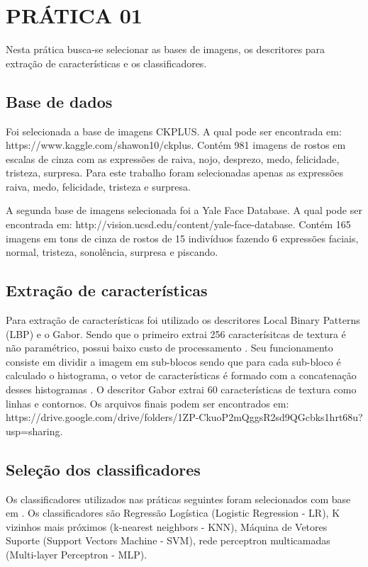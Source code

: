 \documentclass[a4paper, 12 pt, conference]{ieeeconf}  %
\begin{document}
\section{PRÁTICA 01}
\label{pratica01}
Nesta prática busca-se selecionar as bases de imagens, os descritores para extração de características e os classificadores.

\subsection{Base de dados}
Foi selecionada a base de imagens CKPLUS. A qual pode ser encontrada em: https://www.kaggle.com/shawon10/ckplus. Contém 981 imagens de rostos em escalas de cinza com as expressões de raiva, nojo, desprezo, medo, felicidade, tristeza, surpresa. Para este trabalho foram selecionadas apenas as expressões raiva, medo, felicidade, tristeza e surpresa.

A segunda base de imagens selecionada foi a Yale Face Database. A qual pode ser encontrada em: http://vision.ucsd.edu/content/yale-face-database. Contém 165 imagens em tons de cinza de rostos de 15 indivíduos fazendo 6 expressões faciais, normal, tristeza, sonolência, surpresa e piscando.

\subsection{Extração de características}
Para extração de características foi utilizado os descritores Local Binary Patterns (LBP) e o Gabor. Sendo que o primeiro extrai 256 caracterísitcas de textura é não paramétrico, possui baixo custo de processamento \cite{rajan:19}. Seu funcionamento consiste em dividir a imagem em sub-blocos sendo que para cada sub-bloco é calculado o histograma, o vetor de características é formado com a concatenação desses histogramas \cite{rajan:19}. O descritor Gabor extrai 60 características de textura como linhas e contornos. Os arquivos finais podem ser encontrados em: https://drive.google.com/drive/folders/1ZP-CkuoP2mQggsR2sd9QGcbks1hrt68u?usp=sharing.

\subsection{Seleção dos classificadores}
Os classificadores utilizados nas práticas seguintes foram selecionados com base em \cite{rajan:19}. Os classificadores são Regressão Logística (Logistic Regression - LR), K vizinhos mais próximos (k-nearest neighbors - KNN), Máquina de Vetores Suporte (Support Vectors Machine - SVM), rede perceptron multicamadas (Multi-layer Perceptron - MLP).
\end{document}
